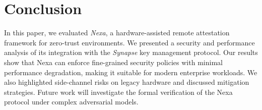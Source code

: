 \section{Conclusion}
\label{sec:conclusion}
In this paper, we evaluated \emph{Nexa}, a hardware-assisted remote attestation framework for zero-trust environments. We presented a security and performance analysis of its integration with the \emph{Synapse} key management protocol. Our results show that Nexa can enforce fine-grained security policies with minimal performance degradation, making it suitable for modern enterprise workloads. We also highlighted side-channel risks on legacy hardware and discussed mitigation strategies. Future work will investigate the formal verification of the Nexa protocol under complex adversarial models.



